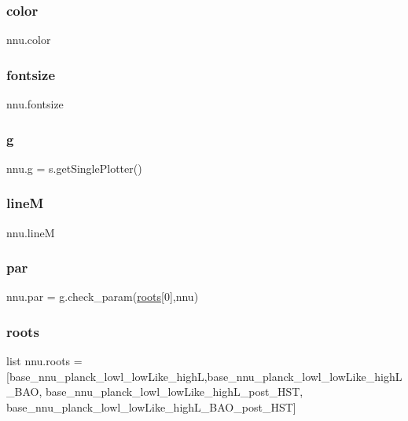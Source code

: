\subsubsection{\texorpdfstring{color}{color}}
{\footnotesize\ttfamily nnu.\+color}

\mbox{\label{namespacennu_a6ad51dd7b3acf681ddd09ec4a3d7c2d5}} 
\subsubsection{\texorpdfstring{fontsize}{fontsize}}
{\footnotesize\ttfamily nnu.\+fontsize}

\mbox{\label{namespacennu_aad23f333e444d294373fe24e7fb3b692}} 
\subsubsection{\texorpdfstring{g}{g}}
{\footnotesize\ttfamily nnu.\+g = s.\+get\+Single\+Plotter()}

\mbox{\label{namespacennu_acd5b6cec06952e5964a9e349bf5c1155}} 
\subsubsection{\texorpdfstring{lineM}{lineM}}
{\footnotesize\ttfamily nnu.\+lineM}

\mbox{\label{namespacennu_a18197daa66fc4578a031ccee0a4aabe0}} 
\subsubsection{\texorpdfstring{par}{par}}
{\footnotesize\ttfamily nnu.\+par = g.\+check\+\_\+param(\mbox{\hyperlink{namespacennu_af565fbca18851eea4ad5e271bb575879}{roots}}\mbox{[}0\mbox{]},\textquotesingle{}nnu\textquotesingle{})}

\mbox{\label{namespacennu_af565fbca18851eea4ad5e271bb575879}} 
\subsubsection{\texorpdfstring{roots}{roots}}
{\footnotesize\ttfamily list nnu.\+roots = \mbox{[}\textquotesingle{}base\+\_\+nnu\+\_\+planck\+\_\+lowl\+\_\+low\+Like\+\_\+highL\textquotesingle{},\textquotesingle{}base\+\_\+nnu\+\_\+planck\+\_\+lowl\+\_\+low\+Like\+\_\+high\+L\+\_\+\+B\+AO\textquotesingle{}, \textquotesingle{}base\+\_\+nnu\+\_\+planck\+\_\+lowl\+\_\+low\+Like\+\_\+high\+L\+\_\+post\+\_\+\+H\+ST\textquotesingle{}, \textquotesingle{}base\+\_\+nnu\+\_\+planck\+\_\+lowl\+\_\+low\+Like\+\_\+high\+L\+\_\+\+B\+A\+O\+\_\+post\+\_\+\+H\+ST\textquotesingle{}\mbox{]}}

